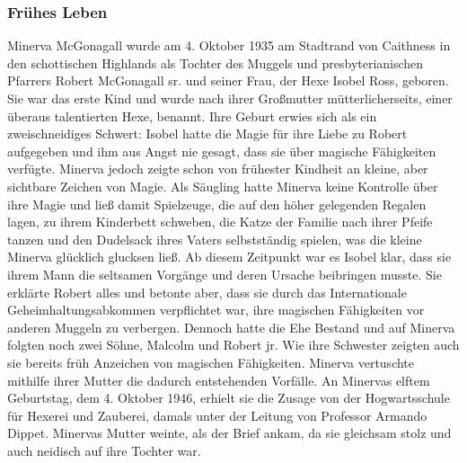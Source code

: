 \documentclass[a4paper, 10pt]{article}
\begin{document}
\subsubsection*{\large Frühes Leben}
Minerva McGonagall wurde am 4. Oktober 1935 am Stadtrand von Caithness in den schottischen Highlands als Tochter des Muggels und presbyterianischen Pfarrers Robert McGonagall sr. und seiner Frau, der Hexe Isobel Ross, geboren. Sie war das erste Kind und wurde nach ihrer Großmutter mütterlicherseits, einer überaus talentierten Hexe, benannt.
\vspace{10pt}
\newline
{}  
Ihre Geburt erwies sich als ein zweischneidiges Schwert: Isobel hatte die Magie für ihre Liebe zu Robert aufgegeben und ihm aus Angst nie gesagt, dass sie über magische Fähigkeiten verfügte. Minerva jedoch zeigte schon von frühester Kindheit an kleine, aber sichtbare Zeichen von Magie. Als Säugling hatte Minerva keine Kontrolle über ihre Magie und ließ damit Spielzeuge, die auf den höher gelegenden Regalen lagen, zu ihrem Kinderbett schweben, die Katze der Familie nach ihrer Pfeife tanzen und den Dudelsack ihres Vaters selbstständig spielen, was die kleine Minerva glücklich glucksen ließ. Ab diesem Zeitpunkt war es Isobel klar, dass sie ihrem Mann die seltsamen Vorgänge und deren Ursache beibringen musste. Sie erklärte Robert alles und betonte aber, dass sie durch das Internationale Geheimhaltungsabkommen verpflichtet war, ihre magischen Fähigkeiten vor anderen Muggeln zu verbergen.
\vspace{10pt}
\newline
{}  
Dennoch hatte die Ehe Bestand und auf Minerva folgten noch zwei Söhne, Malcolm und Robert jr. Wie ihre Schwester zeigten auch sie bereits früh Anzeichen von magischen Fähigkeiten. Minerva vertuschte mithilfe ihrer Mutter die dadurch entstehenden Vorfälle.
\vspace{10pt}
\newline
{}  
An Minervas elftem Geburtstag, dem 4. Oktober 1946, erhielt sie die Zusage von der Hogwartsschule für Hexerei und Zauberei, damals unter der Leitung von Professor Armando Dippet. Minervas Mutter weinte, als der Brief ankam, da sie gleichsam stolz und auch neidisch auf ihre Tochter war.
\end{document}
